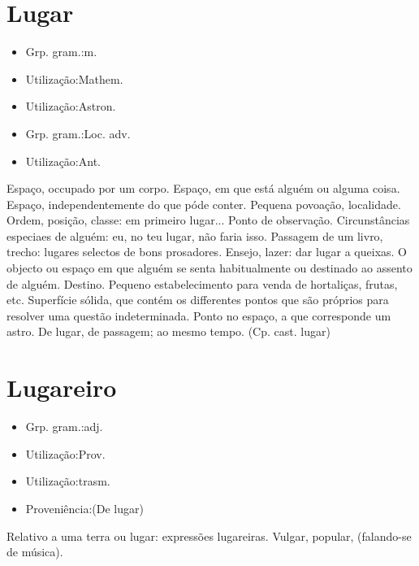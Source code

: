 \section{Lugar}
\begin{itemize}
\item {Grp. gram.:m.}
\end{itemize}
\begin{itemize}
\item {Utilização:Mathem.}
\end{itemize}
\begin{itemize}
\item {Utilização:Astron.}
\end{itemize}
\begin{itemize}
\item {Grp. gram.:Loc. adv.}
\end{itemize}
\begin{itemize}
\item {Utilização:Ant.}
\end{itemize}
Espaço, occupado por um corpo.
Espaço, em que está alguém ou alguma coisa.
Espaço, independentemente do que póde conter.
Pequena povoação, localidade.
Ordem, posição, classe: \textunderscore em primeiro lugar...\textunderscore 
Ponto de observação.
Circunstâncias especiaes de alguém: \textunderscore eu, no teu lugar, não faria isso\textunderscore .
Passagem de um livro, trecho: \textunderscore lugares selectos de bons prosadores\textunderscore .
Ensejo, lazer: \textunderscore dar lugar a queixas\textunderscore .
O objecto ou espaço em que alguém se senta habitualmente ou destinado ao assento de alguém.
Destino.
Pequeno estabelecimento para venda de hortaliças, frutas, etc.
Superfície sólida, que contém os differentes pontos que são próprios para resolver uma questão indeterminada.
Ponto no espaço, a que corresponde um astro.
\textunderscore De lugar\textunderscore , de passagem; ao mesmo tempo.
(Cp. cast. \textunderscore lugar\textunderscore )
\section{Lugareiro}
\begin{itemize}
\item {Grp. gram.:adj.}
\end{itemize}
\begin{itemize}
\item {Utilização:Prov.}
\end{itemize}
\begin{itemize}
\item {Utilização:trasm.}
\end{itemize}
\begin{itemize}
\item {Proveniência:(De \textunderscore lugar\textunderscore )}
\end{itemize}
Relativo a uma terra ou lugar: \textunderscore expressões lugareiras\textunderscore .
Vulgar, popular, (falando-se de música).
